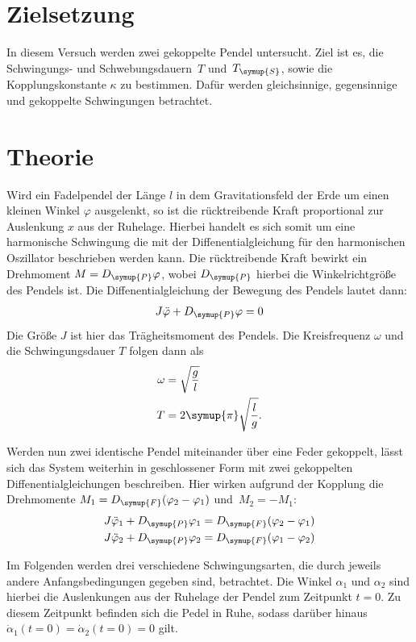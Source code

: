 \section{Zielsetzung}
\label{sec:Zielsetzung}
In diesem Versuch werden zwei gekoppelte Pendel untersucht. Ziel ist es, die Schwingungs- und Schwebungsdauern~$T$ und~$T_{\symup{S}}$, sowie die
Kopplungskonstante $\kappa$ zu bestimmen. Dafür werden gleichsinnige, gegensinnige und gekoppelte Schwingungen betrachtet.

\section{Theorie}
\label{sec:Theorie}
Wird ein Fadelpendel der Länge $l$ in dem Gravitationsfeld der Erde um einen kleinen Winkel $\varphi$ ausgelenkt, so ist die rücktreibende Kraft
proportional zur Auslenkung $x$ aus der Ruhelage. Hierbei handelt es sich somit um eine harmonische Schwingung die mit der Diffenentialgleichung für
den harmonischen Oszillator beschrieben werden kann. Die rücktreibende Kraft bewirkt ein Drehmoment $M=D_{\symup{P}}\varphi$, wobei $D_{\symup{P}}$
hierbei die Winkelrichtgröße des Pendels ist. Die Diffenentialgleichung der Bewegung des Pendels lautet dann:
\begin{align*}
    J\ddot{\varphi} + D_{\symup{P}}\varphi = 0
\end{align*}
Die Größe $J$ ist hier das Trägheitsmoment des Pendels.
Die Kreisfrequenz $\omega$ und die Schwingungsdauer $T$ folgen dann als
\begin{align}
    \omega &= \sqrt{\frac{g}{l}} \notag \\%
    T &= 2\symup{\pi}\sqrt{\frac{l}{g}}. \label{eq:Schwingungsdauer}
\end{align}

Werden nun zwei identische Pendel miteinander über eine Feder gekoppelt, lässt sich das System weiterhin in geschlossener Form mit zwei gekoppelten
Diffenentialgleichungen beschreiben. Hier wirken aufgrund der Kopplung die Drehmomente $M_1=D_{\symup{F}}(\varphi_2-\varphi_1)$ und~$M_2=-M_1$:
\begin{align*}
    J\ddot{\varphi}_{{1}} + D_{\symup{P}} \varphi_{1} &= D_{\symup{F}}(\varphi_2-\varphi_1) \\
    J\ddot{\varphi}_{{2}} + D_{\symup{P}} \varphi_{2} &= D_{\symup{F}}(\varphi_1-\varphi_2)
\end{align*}

Im Folgenden werden drei verschiedene Schwingungsarten, die durch jeweils andere Anfangsbedingungen gegeben sind, betrachtet. Die Winkel $\alpha_1$ 
und $\alpha_2$ sind hierbei die Auslenkungen aus der Ruhelage der Pendel zum Zeitpunkt $t=0$. Zu diesem Zeitpunkt befinden sich die Pedel in Ruhe, 
sodass darüber hinaus $\dot{\alpha}_{1}(t=0) = \dot{\alpha}_{2}(t=0) = 0$ gilt. \\


